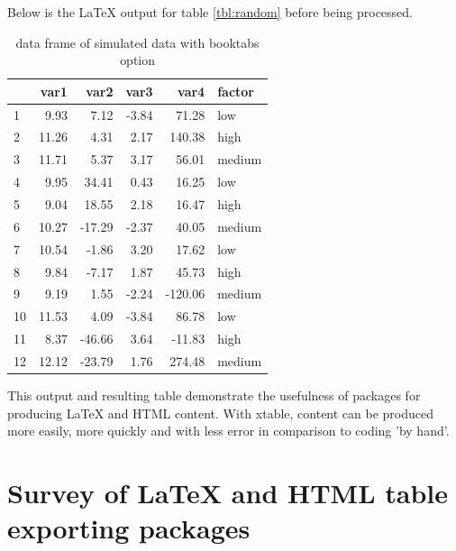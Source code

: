 \documentclass{memoir}\usepackage[]{graphicx}\usepackage[]{color}
\newcommand{\pkg}[1]{{\fontseries{b}\selectfont #1}}
\newcommand{\latex}{\LaTeX\xspace}
\begin{document}
\newpage

Below is the \latex output for table \ref{tbl:random} before being processed.

\vspace{3mm}
\begin{codelisting}[caption={latex table via xtable},language=R]
\begin{table}[ht]
\centering
\begin{tabular}{|lr|r|r|r|l|}
  \toprule
 & var1 & var2 & var3 & var4 & factor \\
  \midrule
 1 & 9.93 & 7.12 & -3.84 & 71.28 & low \\
 2 & 11.26 & 4.31 & 2.17 & 140.38 & high \\
 3 & 11.71 & 5.37 & 3.17 & 56.01 & medium \\
 4 & 9.95 & 34.41 & 0.43 & 16.25 & low \\
 5 & 9.04 & 18.55 & 2.18 & 16.47 & high \\
 6 & 10.27 & -17.29 & -2.37 & 40.05 & medium \\
 7 & 10.54 & -1.86 & 3.20 & 17.62 & low \\
 8 & 9.84 & -7.17 & 1.87 & 45.73 & high \\
 9 & 9.19 & 1.55 & -2.24 & -120.06 & medium \\
 10 & 11.53 & 4.09 & -3.84 & 86.78 & low \\
 11 & 8.37 & -46.66 & 3.64 & -11.83 & high \\
 12 & 12.12 & -23.79 & 1.76 & 274.48 & medium \\
  \bottomrule
\end{tabular}
\caption{data frame of simulated data with booktabs option}
\end{table}
\end{codelisting}

\vspace{3mm}

This output and resulting table demonstrate the usefulness of packages for producing \latex and HTML content. With \pkg{xtable}, content can be produced more easily, more quickly and with less error in comparison to coding 'by hand'. 


\newpage

\section{Survey of \latex and HTML table exporting packages}
\end{document}
